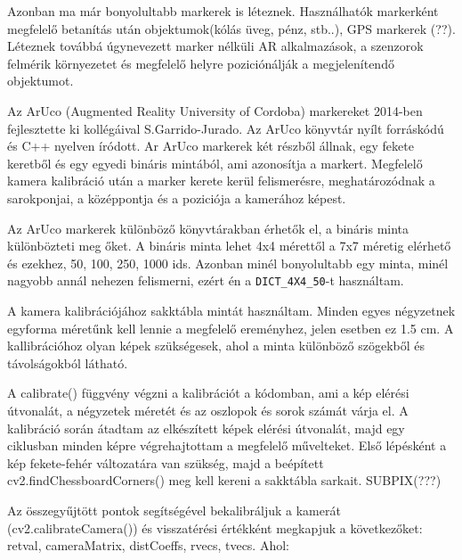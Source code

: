 Azonban ma már bonyolultabb markerek is léteznek. Használhatók markerként megfelelő betanítás után objektumok(kólás üveg, pénz, stb..), GPS markerek (??).
Léteznek továbbá úgynevezett marker nélküli AR alkalmazások, a szenzorok felmérik környezetet és megfelelő helyre poziciónálják a megjelenítendő objektumot.




Az ArUco (Augmented Reality University of Cordoba) markereket 2014-ben fejlesztette ki kollégáival S.Garrido-Jurado. 
Az ArUco könyvtár nyílt forráskódú és C++ nyelven íródott. 
Ar ArUco markerek két részből állnak, egy fekete keretből és egy egyedi bináris mintából, ami azonosítja a markert.
Megfelelő kamera kalibráció után a marker kerete kerül felismerésre, meghatározódnak a sarokponjai, a középpontja és a poziciója a kamerához képest.


Az ArUco markerek különböző könyvtárakban érhetők el, a bináris minta különbözteti meg őket. A bináris minta lehet 4x4 mérettől a 7x7 méretig elérhető és ezekhez, 50, 100, 250, 1000 ids. Azonban minél bonyolultabb egy minta, minél nagyobb annál nehezen felismerni, ezért én a  \texttt{DICT\_4X4\_50}-t használtam.


A kamera kalibrációjához sakktábla mintát használtam. Minden egyes négyzetnek egyforma méretűnk kell lennie a megfelelő ereményhez, jelen esetben ez 1.5 cm. 
A kallibrációhoz olyan képek szükségesek, ahol a minta különböző szögekből és távolságokból látható.

A calibrate() függvény végzni a kalibrációt a kódomban, ami a kép elérési útvonalát, a négyzetek méretét és az oszlopok és sorok számát várja el. A kalibráció során átadtam az elkészített képek elérési útvonalát, majd egy ciklusban minden képre végrehajtottam a megfelelő művelteket.
Első lépésként a kép fekete-fehér változatára van szükség, majd a beépített cv2.findChessboardCorners() meg kell kereni a sakktábla sarkait.
SUBPIX(???)

Az összegyűjtött pontok segítségével bekalibráljuk a kamerát (cv2.calibrateCamera()) és visszatérési értékként megkapjuk a következőket:
retval, cameraMatrix, distCoeffs, rvecs, tvecs. Ahol:

